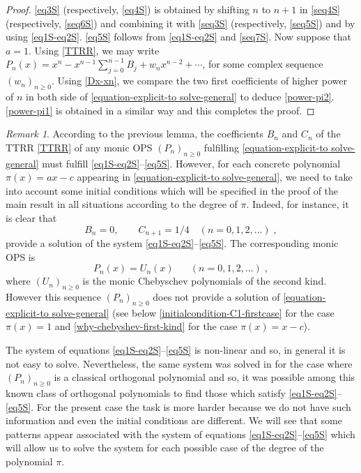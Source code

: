 \documentclass{amsart}
\theoremstyle{remark}
\newtheorem{remark}[theorem]{Remark}
\numberwithin{equation}{section}
\begin{document}
\begin{proof}
\eqref{eq3S} (respectively, \eqref{eq4S}) is obtained by shifting $n$ to $n+1$ in \eqref{seq4S} (respectively, \eqref{seq6S}) and combining it with \eqref{seq3S} (respectively, \eqref{seq5S}) and by using \eqref{eq1S-eq2S}. \eqref{eq5S} follows from \eqref{eq1S-eq2S} and \eqref{seq7S}. Now suppose that $a=1$. Using \eqref{TTRR}, we may write $ P_n (x)=x^n -x^{n-1}\sum_{j=0} ^{n-1} B_j +w_nx^{n-2}+\cdots$, for some complex sequence $(w_n)_{n\geq0}$. Using \eqref{Dx-xn}, we compare the two first coefficients of higher power of $n$ in both side of \eqref{equation-explicit-to solve-general} to deduce \eqref{power-pi2}. \eqref{power-pi1} is obtained in a similar way and this completes the proof.  
\end{proof}

\begin{remark}
According to the previous lemma, the coefficients $B_n$ and $C_n$ of the TTRR \eqref{TTRR} of any monic OPS $(P_n)_{n\geq 0}$ fulfilling \eqref{equation-explicit-to solve-general} must fulfill \eqref{eq1S-eq2S}--\eqref{eq5S}. However, for each concrete polynomial $\pi(x)=ax-c$ appearing in \eqref{equation-explicit-to solve-general}, we need to take into account some initial conditions which will be specified in the proof of the main result in all situations according to the degree of $\pi$. 
Indeed, for instance, it is clear that
$$B_n=0,\quad \quad C_{n+1}=1/4\quad (n=0,1,2,\ldots)\;,$$ provide a solution of the system \eqref{eq1S-eq2S}--\eqref{eq5S}. The corresponding monic OPS is
$$P_n (x)=U_n \left(x\right)~\quad~~(n=0,1,2,\ldots)\;, $$ where $(U_n)_{n \geq 0}$ is the monic Chebyschev polynomials of the second kind. However this sequence $(P_n)_{n \geq 0}$ does not provide a solution of \eqref{equation-explicit-to solve-general}  (see below \eqref{initialcondition-C1-firstcase} for the case $\pi(x)=1$ and \eqref{why-chebyshev-first-kind} for the case $\pi(x)=x-c$). 
\end{remark}

 The system of equations \eqref{eq1S-eq2S}--\eqref{eq5S} is non-linear and so, in general it is not easy to solve. Nevertheless, the same system was solved in \cite{KCDMJP2021c} for the case where $(P_n)_{n\geq 0}$ is a classical orthogonal polynomial and so, it was possible among this known class of orthogonal polynomials to find those which satisfy \eqref{eq1S-eq2S}--\eqref{eq5S}. For the present case the task is more harder because we do not have such information and even the initial conditions are different. We will see that some patterns appear associated with the system of equations \eqref{eq1S-eq2S}--\eqref{eq5S} which will allow us to solve the system for each possible case of the degree of the polynomial $\pi$. 
\end{document}
